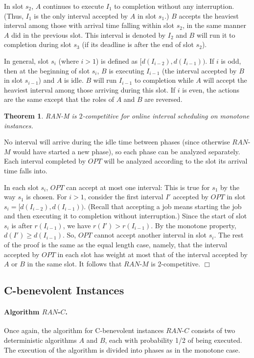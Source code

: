 \documentclass[11pt]{article}
\newtheorem{theorem}{Theorem}[section]
\newcommand{\qed}{\hspace*{\fill}$\Box$\par\medskip}
\newenvironment{proof}{\noindent{\it Proof. }\ignorespaces}{\qed}
\begin{document}
In slot $s_2$, $A$ continues to execute $I_1$ to completion without any 
interruption.
(Thus, $I_1$ is the only interval accepted by $A$ in slot $s_1$.)
$B$ accepts the heaviest interval among 
those with arrival time falling within slot $s_2$, in the same manner $A$
did in the previous slot.
This interval is denoted by $I_2$ and $B$ will
run it to completion during slot $s_3$
(if its deadline is after the end of slot $s_2$).

In general, slot $s_i$ (where $i>1$)
is defined as $[d(I_{i-2}), d(I_{i-1}))$.  
If $i$ is odd, then at the beginning of slot $s_i$,
$B$ is executing $I_{i-1}$ (the interval accepted by $B$ in slot $s_{i-1}$) 
and $A$ is idle.
$B$ will run $I_{i-1}$ to completion while
$A$ will accept the heaviest interval among those arriving
during this slot.
If $i$ is even, the actions are the same except that
the roles of $A$ and $B$ are reversed.

\begin{theorem}
RAN-M is $2$-competitive for online interval scheduling on monotone instances.
\end{theorem}
\begin{proof}
No interval will arrive during the idle time between phases (since otherwise
$RAN$-$M$ would have started a new phase), so each phase can be analyzed 
separately. Each interval completed by $OPT$ will be analyzed according
to the slot its arrival time falls into.

In each slot $s_i$, $OPT$ can accept at most one interval:
This is true for $s_1$ by the way $s_1$ is chosen.
For $i>1$,
consider the first interval $I'$ accepted by $OPT$ in slot
$s_i = [d(I_{i-2}), d(I_{i-1}))$.
(Recall that accepting a job means starting the job and then
executing it to completion without interruption.)
Since the start of slot $s_i$ is after $r(I_{i-1})$,
we have $r(I') > r(I_{i-1})$.
By the monotone property, $d(I') \geq d(I_{i-1})$.
So, $OPT$ cannot accept another interval in slot $s_i$.
The rest of the proof is the same as the equal length case,
namely, that the interval accepted 
by $OPT$ in each slot has weight at most that of the interval
accepted by $A$ or $B$ in the same slot.  
It follows that $RAN$-$M$ is 2-competitive.  
\end{proof}

\subsection{C-benevolent Instances}

\paragraph{Algorithm $RAN$-$C$.}
Once again, the algorithm for C-benevolent instances
$RAN$-$C$ consists of two deterministic algorithms $A$ and $B$,
each with probability 1/2 of being executed.
The execution of the algorithm is divided into phases as in the monotone
case.
\end{document}
